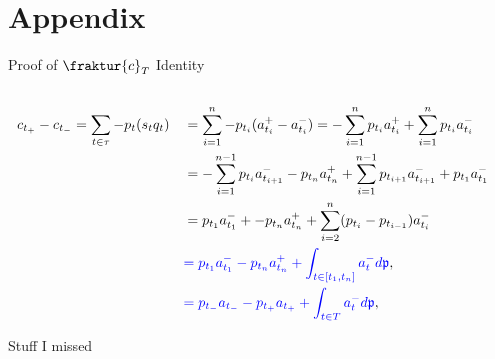 \documentclass{beamer}
\begin{document}

\section{Appendix}
\begin{frame}{Proof of $\fraktur{c}_T$ Identity}
	\begin{align*}
		\\	c_{t_+} - c_{t_-}	&= \sum_{t\in\tau} - p_t (s_t q_t)	&&= \sum_{i=1}^n - p_{t_i} (a_{t_i}^+-a_{t_i}^-) = - \sum_{i=1}^n p_{t_i} a_{t_i}^+ + \sum_{i=1}^n p_{t_i} a_{t_i}^-
		\\				&					&&= - \sum_{i=1}^{n-1} p_{t_i} a_{t_{i+1}}^- - p_{t_n} a_{t_n}^+ + \sum_{i=1}^{n-1} p_{t_{i+1}} a_{t_{i+1}}^- + p_{t_1}a_{t_1}^-
		\\				&					&&= p_{t_1}a_{t_1}^- + - p_{t_n} a_{t_n}^+ + \sum_{i=2}^n (p_{t_i}-p_{t_{i-1}}) a_{t_i}^-
		\\				&					&&\textcolor{blue}{= p_{t_1}a_{t_1}^- - p_{t_n}a_{t_n}^+ + \int_{t\in[t_1,t_n]} a_t^- d\mathfrak{p}},
		\\				&					&&\textcolor{blue}{= p_{t_-}a_{t_-} - p_{t_+}a_{t_+} + \int_{t\in T} a_t^- d\mathfrak{p}},
	\end{align*}
\end{frame}

\begin{frame}{Stuff I missed}
\end{frame}
\end{document}

